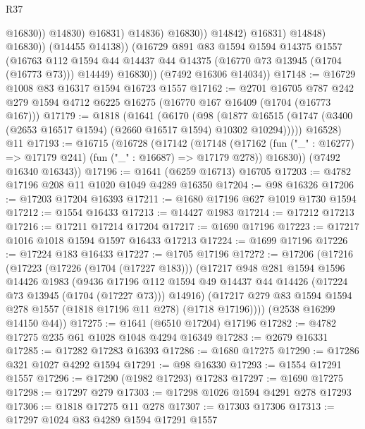 \begin{lexlean}{R37}
\begin{coremodule}
                                  @16830))
                              @14830)
                            @16831)
                          @14836)
                        @16830))
                    @14842)
                  @16831)
                @14848)
              @16830))
          (@14455 @14138))
        (@16729
          @891
          @83
          @1594
          @1594
          @14375
          @1557
          (@16763 @112 @1594 @44 @14437 @44 @14375 (@16770 @73 @13945 (@1704 (@16773 @73))) @14449)
          @16830))
      (@7492 @16306 @14034))
@17148 := @16729 @1008 @83 @16317 @1594 @16723 @1557
@17162 := @2701
    @16705
    @787
    @242
    @279
    @1594
    @4712
    @6225
    @16275
    (@16770 @167 @16409 (@1704 (@16773 @167)))
@17179 := @1818
    (@1641
      (@6170
        (@98
          (@1877 @16515 (@1747 (@3400 (@2653 @16517 @1594) (@2660 @16517 @1594) @10302 @10294)))))
      @16528)
    @11
@17193 := @16715
    (@16728
      (@17142
        (@17148
          (@17162 (fun ("_" : @16277) => @17179 @241) (fun ("_" : @16687) => @17179 @278))
          @16830))
      (@7492 @16340 @16343))
@17196 := @1641 (@6259 @16713) @16705
@17203 := @4782 @17196 @208 @11 @1020 @1049 @4289 @16350
@17204 := @98 @16326
@17206 := @17203 @17204 @16393
@17211 := @1680 @17196 @627 @1019 @1730 @1594
@17212 := @1554 @16433
@17213 := @14427 @1983
@17214 := @17212 @17213
@17216 := @17211 @17214 @17204
@17217 := @1690 @17196
@17223 := @17217 @1016 @1018 @1594 @1597 @16433 @17213
@17224 := @1699 @17196
@17226 := @17224 @183 @16433
@17227 := @1705 @17196
@17272 := @17206
    (@17216
      (@17223
        (@17226 (@1704 (@17227 @183)))
        (@17217
          @948
          @281
          @1594
          @1596
          @14426
          @1983
          (@9436
            @17196
            @112
            @1594
            @49
            @14437
            @44
            @14426
            (@17224 @73 @13945 (@1704 (@17227 @73)))
            @14916)
          (@17217 @279 @83 @1594 @1594 @278 @1557 (@1818 @17196 @11 @278) (@1718 @17196))))
      (@2538 @16299 @14150 @44))
@17275 := @1641 (@6510 @17204) @17196
@17282 := @4782 @17275 @235 @61 @1028 @1048 @4294 @16349
@17283 := @2679 @16331
@17285 := @17282 @17283 @16393
@17286 := @1680 @17275
@17290 := @17286 @321 @1027 @4292 @1594
@17291 := @98 @16330
@17293 := @1554 @17291 @1557
@17296 := @17290 (@1982 @17293) @17283
@17297 := @1690 @17275
@17298 := @17297 @279
@17303 := @17298 @1026 @1594 @4291 @278 @17293
@17306 := @1818 @17275 @11 @278
@17307 := @17303 @17306
@17313 := @17297 @1024 @83 @4289 @1594 @17291 @1557

\end{coremodule}
\end{lexlean}
